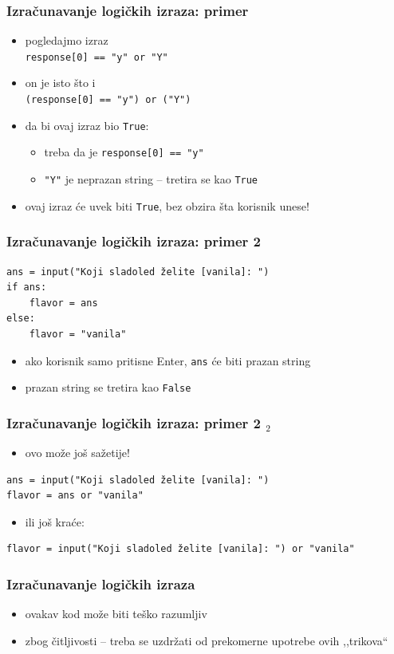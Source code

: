 \documentclass[utf8,compress]{beamer}
\begin{document}
\begin{frame}[fragile]
  \frametitle{Izračunavanje logičkih izraza: primer}
  \begin{itemize}
    \item pogledajmo izraz \\
      \texttt{response[0] == "y" or "Y"}
    \item on je isto što i \\
      \texttt{(response[0] == "y") or ("Y")}
    \item da bi ovaj izraz bio \texttt{True}:
    \begin{itemize}
      \item treba da je \texttt{response[0] == "y"}
      \item \texttt{"Y"} je neprazan string -- tretira se kao \texttt{True}
    \end{itemize}
    \item ovaj izraz će uvek biti \texttt{True}, bez obzira šta korisnik unese!
  \end{itemize}
\end{frame}

\begin{frame}[fragile]
  \frametitle{Izračunavanje logičkih izraza: primer 2}
\begin{verbatim}
ans = input("Koji sladoled želite [vanila]: ")
if ans:
    flavor = ans
else:
    flavor = "vanila"
\end{verbatim}
  \begin{itemize}
    \item ako korisnik samo pritisne Enter, \texttt{ans} će biti prazan string
    \item prazan string se tretira kao \texttt{False}
  \end{itemize}
\end{frame}

\begin{frame}[fragile,shrink=5]
  \frametitle{Izračunavanje logičkih izraza: primer 2 $_2$}
  \begin{itemize}
    \item ovo može još sažetije!
  \end{itemize}
\begin{verbatim}
ans = input("Koji sladoled želite [vanila]: ")
flavor = ans or "vanila"
\end{verbatim}
  \begin{itemize}
    \item ili još kraće:
  \end{itemize}
\begin{verbatim}
flavor = input("Koji sladoled želite [vanila]: ") or "vanila"
\end{verbatim}
\end{frame}

\begin{frame}[fragile]
  \frametitle{Izračunavanje logičkih izraza}
  \begin{itemize}
    \item ovakav kod može biti teško razumljiv
    \item zbog čitljivosti -- treba se uzdržati od prekomerne upotrebe ovih ,,trikova``
  \end{itemize}
\end{frame}
\end{document}
